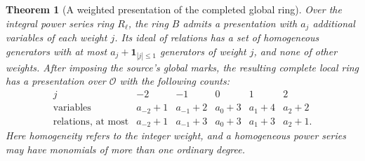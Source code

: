 \documentclass[a4paper,11pt]{article}
\newtheorem{theorem}[proposition]{Theorem}
\theoremstyle{definition}
\theoremstyle{remark}
\numberwithin{equation}{section}
\newcommand{\OO}{\mathcal O}
\begin{document}
\begin{theorem}[A weighted presentation of the completed global ring]\label{thm:pres70}
Over the integral power series ring \(R_\ell\), the ring \(B\)
admits a presentation with \(a_j\) additional variables of each
weight \(j\). Its ideal of relations has a set of homogeneous
generators with at most \(a_j+\mathbf1_{|j|\le1}\) generators
of weight \(j\), and none of other weights. After imposing the
source's global marks, the resulting complete local ring has
a presentation over \(\OO\) with the following counts:
\[
\begin{array}{c|ccccc}
 j&-2&-1&0&1&2\\ \hline
 \text{variables}&a_{-2}+1&a_{-1}+2&a_0+3&a_1+4&a_2+2\\
 \text{relations, at most}&a_{-2}+1&a_{-1}+3&a_0+3&a_1+3&a_2+1.
\end{array}
\]
Here homogeneity refers to the integer weight, and a homogeneous
power series may have monomials of more than one ordinary degree.
\end{theorem}
\end{document}
